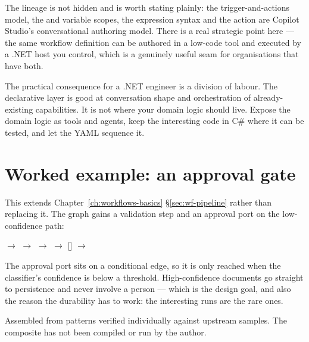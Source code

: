 The lineage is not hidden and is worth stating plainly: the trigger-and-actions
model, the  and  variable scopes, the expression
syntax and the  action are Copilot Studio's conversational
authoring model. There is a real strategic point here --- the same workflow
definition can be authored in a low-code tool and executed by a .NET host you
control, which is a genuinely useful seam for organisations that have both.

The practical consequence for a .NET engineer is a division of labour. The
declarative layer is good at conversation shape and orchestration of
already-existing capabilities. It is not where your domain logic should live.
Expose the domain logic as tools and agents, keep the interesting code in C\#
where it can be tested, and let the YAML sequence it.

\section{Worked example: an approval gate}
\label{sec:dur-pipeline}

This extends Chapter~\ref{ch:workflows-basics} \S\ref{sec:wf-pipeline} rather
than replacing it. The graph gains a validation step and an approval port on the
low-confidence path:

\begin{center}
\small
{} $\rightarrow$  $\rightarrow$ 
$\rightarrow$  $\rightarrow$ [] $\rightarrow$
\end{center}

\noindent
The approval port sits on a conditional edge, so it is only reached when the
classifier's confidence is below a threshold. High-confidence documents go
straight to persistence and never involve a person --- which is the design goal,
and also the reason the durability has to work: the interesting runs are the rare
ones.

\begin{verifybox}
Assembled from patterns verified individually against upstream samples. The
composite has not been compiled or run by the author.
\end{verifybox}


